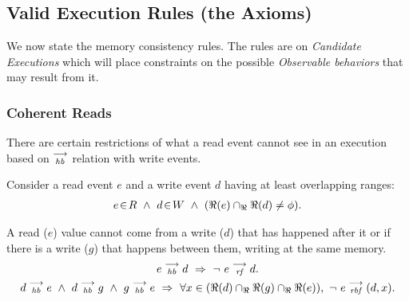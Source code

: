 
    \subsection{Valid Execution Rules (the Axioms)}
        We now state the memory consistency rules. The rules are on \textit{Candidate Executions} which will place constraints on the possible \textit{Observable behaviors} that may result from it.
         
        \subsubsection{Coherent Reads} 
        
            There are certain restrictions of what a read event cannot see in an execution based on $\stackrel{\longrightarrow}{_\textit{hb}}$ relation with write events.
            
            Consider a read event $e$ and a write event $d$ having at least overlapping ranges:
            \begin{align*}
                \event{e}{R} \ \wedge \ 
                \event{d}{W} \ \wedge \
                (\Re(e) \cap_\Re \Re(d) \neq \phi).
            \end{align*}
            
            A read ($e$) value cannot come from a write ($d$) that has happened after it or if there is a write ($g$) that happens between them, writing at the same memory.     
                \begin{gather*}
                    \reln{e}{hb}{d}\ \Rightarrow{}\ \neg \ \reln{e}{rf}{d}. \\
                    \reln{d}{hb}{e}
                    \ \wedge \ 
                    \reln{d}{hb}{g} \ \wedge \  \reln{g}{hb}{e}
                    \ \Rightarrow{} \
                    \forall x \in (\Re(d) \cap_\Re \Re(g) \cap_\Re \Re(e)), \ \neg \ \reln{e}{rbf}{(d,x)}.
                \end{gather*}
     
